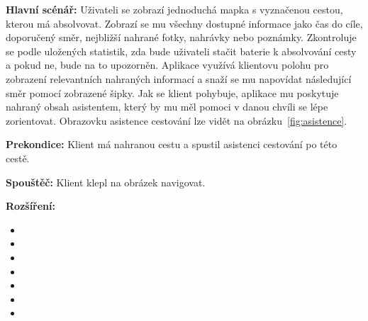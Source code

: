 \documentclass[czech,master,public,dept460,male,java,cpdeclaration]{diploma}
\begin{document}
\vspace{0.1cm}
\noindent
\textbf{Hlavní scénář:} Uživateli se zobrazí jednoduchá mapka s vyznačenou cestou, kterou má absolvovat.
Zobrazí se mu všechny dostupné informace jako čas do cíle, doporučený směr, nejbližší nahrané fotky,
nahrávky nebo poznámky. Zkontroluje se podle uložených statistik, zda bude uživateli stačit baterie
k absolvování cesty a pokud ne, bude na to upozorněn.
Aplikace využívá klientovu polohu pro zobrazení relevantních nahraných informací
a snaží se mu napovídat následující směr pomocí zobrazené šipky. Jak se klient pohybuje, aplikace mu
poskytuje nahraný obsah asistentem, který by mu měl pomoci v danou chvíli se lépe zorientovat.
Obrazovku asistence cestování lze vidět na obrázku~\ref{fig:asistence}.

\vspace{0.1cm}
\noindent
\textbf{Prekondice:} Klient má nahranou cestu a spustil asistenci cestování po této cestě.

\vspace{0.1cm}
\noindent
\textbf{Spouštěč:} Klient klepl na obrázek navigovat.

\vspace{0.1cm}
\noindent
\textbf{Rozšíření:}
\begin{itemize}
  \item {}
  \item {}
  \item {}
  \item {}
  \item {}
  \item {}
  \item {}
\end{itemize}
\end{document}
